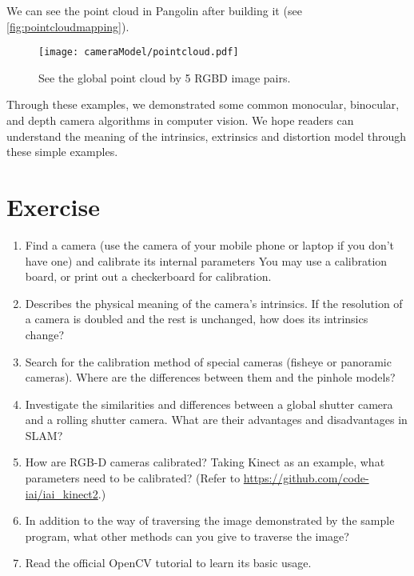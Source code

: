 We can see the point cloud in Pangolin after building it (see \autoref{fig:pointcloudmapping}). 

\begin{figure}[!t]
    \centering
    \texttt{[image: cameraModel/pointcloud.pdf]}
    \caption{See the global point cloud by 5 RGBD image pairs.}
    \label{fig:pointcloudmapping}
\end{figure}

Through these examples, we demonstrated some common monocular, binocular, and depth camera algorithms in computer vision. We hope readers can understand the meaning of the intrinsics, extrinsics and distortion model through these simple examples.

\section * {Exercise}
\begin{enumerate}
\item[\optional] Find a camera (use the camera of your mobile phone or laptop if you don't have one) and calibrate its internal parameters You may use a calibration board, or print out a checkerboard for calibration.
\item Describes the physical meaning of the camera's intrinsics. If the resolution of a camera is doubled and the rest is unchanged, how does its intrinsics change?
\item Search for the calibration method of special cameras (fisheye or panoramic cameras). Where are the differences between them and the pinhole models? 
\item Investigate the similarities and differences between a global shutter camera and a rolling shutter camera. What are their advantages and disadvantages in SLAM?
\item How are RGB-D cameras calibrated? Taking Kinect as an example, what parameters need to be calibrated? (Refer to \url{https://github.com/code-iai/iai_kinect2}.)
\item In addition to the way of traversing the image demonstrated by the sample program, what other methods can you give to traverse the image?
\item[\optional] Read the official OpenCV tutorial to learn its basic usage.
\end{enumerate}

